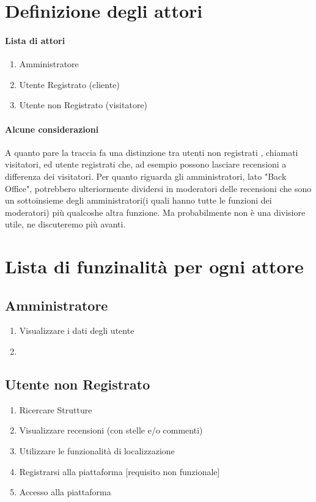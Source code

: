 \documentclass{article}
\begin{document}
\section{Definizione degli attori}
  \paragraph{Lista di attori}
  \begin{enumerate}
      \item Amministratore
      \item Utente Registrato (cliente)
      \item Utente non Registrato (visitatore)
  \end{enumerate}
  \paragraph{Alcune considerazioni}
  A quanto pare la traccia fa una distinzione tra utenti non registrati , chiamati visitatori, ed utente registrati
  che, ad esempio possono lasciare recensioni a differenza dei visitatori.
  Per quanto riguarda gli amministratori, lato "Back Office", potrebbero ulteriormente dividersi in moderatori 
  delle recensioni che sono un sottoinsieme degli amministratori(i quali hanno tutte le funzioni dei moderatori)
 più qualcoshe altra funzione. Ma probabilmente non è una divisiore utile, ne discuteremo più avanti.

 \section{Lista di funzinalità per ogni attore}
 \subsection{Amministratore}
 \begin{enumerate}
    \item Visualizzare i dati degli utente
    \item 
     
 \end{enumerate}
 \subsection{Utente non Registrato}
 \begin{enumerate}
     \item Ricercare Strutture
     \item Visualizzare recensioni (con stelle e/o commenti)
     \item Utilizzare le funzionalità di localizzazione
     \item Registrarsi alla piattaforma [requisito non funzionale] 
     \item Accesso alla piattaforma
 \end{enumerate}
\end{document}
